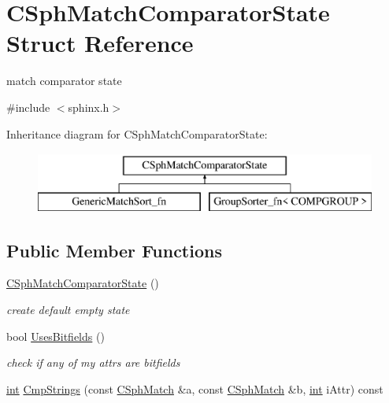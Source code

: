 \hypertarget{structCSphMatchComparatorState}{\section{C\-Sph\-Match\-Comparator\-State Struct Reference}
\label{structCSphMatchComparatorState}
}


match comparator state  




{\ttfamily \#include $<$sphinx.\-h$>$}

Inheritance diagram for C\-Sph\-Match\-Comparator\-State\-:\begin{figure}[H]
\begin{center}
\leavevmode
\includegraphics[height=2.000000cm]{structCSphMatchComparatorState}
\end{center}
\end{figure}
\subsection*{Public Member Functions}
\begin{DoxyCompactItemize}
\item 
\hyperlink{structCSphMatchComparatorState_aefac769bade74c4c3e761afaa6c52de8}{C\-Sph\-Match\-Comparator\-State} ()
\begin{DoxyCompactList}\small\item\em create default empty state \end{DoxyCompactList}\item 
bool \hyperlink{structCSphMatchComparatorState_a33e5177d7ec8f3f321550a5a33d9d16e}{Uses\-Bitfields} ()
\begin{DoxyCompactList}\small\item\em check if any of my attrs are bitfields \end{DoxyCompactList}\item 
\hyperlink{sphinxexpr_8cpp_a4a26e8f9cb8b736e0c4cbf4d16de985e}{int} \hyperlink{structCSphMatchComparatorState_ab8a31139ad219c858ebadffeb91476a0}{Cmp\-Strings} (const \hyperlink{classCSphMatch}{C\-Sph\-Match} \&a, const \hyperlink{classCSphMatch}{C\-Sph\-Match} \&b, \hyperlink{sphinxexpr_8cpp_a4a26e8f9cb8b736e0c4cbf4d16de985e}{int} i\-Attr) const 
\end{DoxyCompactItemize}
